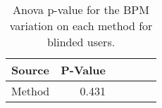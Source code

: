 
\begin{table}[!htb]
\centering
\caption{Anova p-value for the BPM variation on each method for blinded users.}
\label{tab:blocanova_bpm_var_sight}
\begin{tabular}{lrrrrr}
\toprule
Source & P-Value \\
\midrule
Method &   0.431 \\
\bottomrule
\end{tabular}
\end{table}

